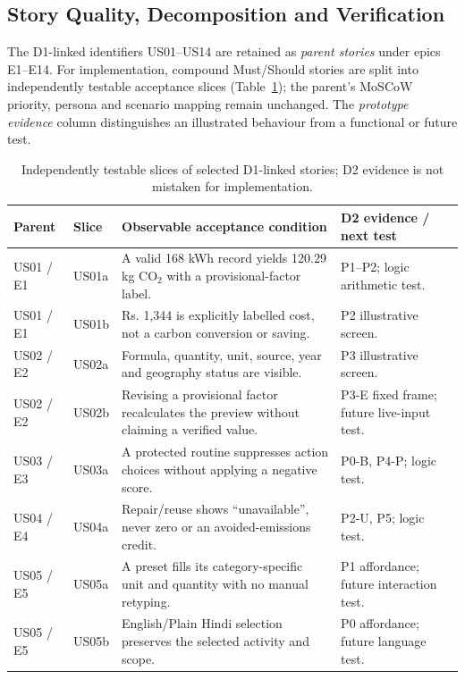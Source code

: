 \documentclass[12pt,a4paper]{article}
\begin{document}
\subsection{Story Quality, Decomposition and Verification}
The D1-linked identifiers US01--US14 are retained as \emph{parent stories} under epics E1--E14. For implementation, compound Must/Should stories are split into independently testable acceptance slices (Table~\ref{tab:atomic-stories}); the parent's MoSCoW priority, persona and scenario mapping remain unchanged. The \emph{prototype evidence} column distinguishes an illustrated behaviour from a functional or future test.

\begin{table}[H]
\centering\small
\caption{Independently testable slices of selected D1-linked stories; D2 evidence is not mistaken for implementation.}
\label{tab:atomic-stories}
\begin{tabularx}{\textwidth}{@{}p{1.27cm}p{1.18cm}>{\raggedright\arraybackslash}X>{\raggedright\arraybackslash}p{3.0cm}@{}}
\toprule
\textbf{Parent} & \textbf{Slice} & \textbf{Observable acceptance condition} & \textbf{D2 evidence / next test}\\
\midrule
US01 / E1 & US01a & A valid 168 kWh record yields 120.29 kg CO$_2$ with a provisional-factor label. & P1--P2; logic arithmetic test.\\
\rowcolor{RowGray}
US01 / E1 & US01b & Rs. 1,344 is explicitly labelled cost, not a carbon conversion or saving. & P2 illustrative screen.\\
US02 / E2 & US02a & Formula, quantity, unit, source, year and geography status are visible. & P3 illustrative screen.\\
\rowcolor{RowGray}
US02 / E2 & US02b & Revising a provisional factor recalculates the preview without claiming a verified value. & P3-E fixed frame; future live-input test.\\
US03 / E3 & US03a & A protected routine suppresses action choices without applying a negative score. & P0-B, P4-P; logic test.\\
\rowcolor{RowGray}
US04 / E4 & US04a & Repair/reuse shows ``unavailable'', never zero or an avoided-emissions credit. & P2-U, P5; logic test.\\
US05 / E5 & US05a & A preset fills its category-specific unit and quantity with no manual retyping. & P1 affordance; future interaction test.\\
\rowcolor{RowGray}
US05 / E5 & US05b & English/Plain Hindi selection preserves the selected activity and scope. & P0 affordance; future language test.\\

\end{tabularx}
\end{table}
\end{document}
